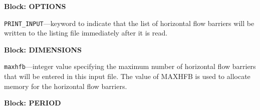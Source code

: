 
\item \textbf{Block: OPTIONS}

\begin{description}
\item \texttt{PRINT\_INPUT}---keyword to indicate that the list of horizontal flow barriers will be written to the listing file immediately after it is read.

\end{description}
\item \textbf{Block: DIMENSIONS}

\begin{description}
\item \texttt{maxhfb}---integer value specifying the maximum number of horizontal flow barriers that will be entered in this input file.  The value of MAXHFB is used to allocate memory for the horizontal flow barriers.

\end{description}
\item \textbf{Block: PERIOD}

